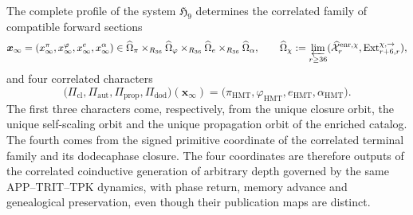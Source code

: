 \begin{theorem}
\label{thm:c27-cuadrirrelacion-generada}
The complete profile of the system \(\mathfrak H_9\) determines the correlated
family of compatible forward sections
\[
 \boldsymbol x_\infty=
 (x_\infty^\pi,x_\infty^\varphi,x_\infty^e,x_\infty^\alpha)
 \in
 \widehat\Omega_\pi\times_{R_{36}}
 \widehat\Omega_\varphi\times_{R_{36}}
 \widehat\Omega_e\times_{R_{36}}\widehat\Omega_\alpha,
 \qquad
 \widehat\Omega_\chi:=
 \varprojlim_{r\ge36}
 (\widehat{\mathcal X}^{\mathrm{enr},\chi}_r,
  \operatorname{Ext}^{\chi,\rightarrow}_{r+6,r}),
\]
and four correlated characters
\[
 \bigl(\Pi_{\mathrm{cl}},\Pi_{\mathrm{aut}},
       \Pi_{\mathrm{prop}},\Pi_{\mathrm{dod}}\bigr)
       (\boldsymbol x_\infty)
 =\bigl(\pi_{\mathrm{HMT}},\varphi_{\mathrm{HMT}},
        e_{\mathrm{HMT}},\alpha_{\mathrm{HMT}}\bigr).
\]
The first three characters come, respectively, from the unique
closure orbit, the unique self-scaling orbit and the unique
propagation orbit of the enriched catalog. The fourth comes from the
signed primitive coordinate of the correlated terminal family and its
dodecaphase closure. The four coordinates are therefore outputs of the
correlated coinductive generation of arbitrary depth governed by
the same APP--TRIT--TPK dynamics, with phase return, memory advance and
genealogical preservation, even though their publication maps are
distinct.
\end{theorem}

